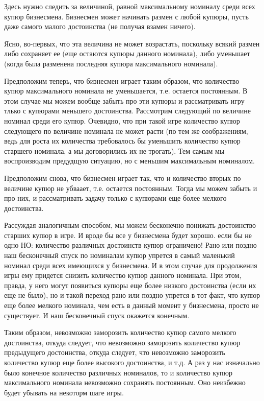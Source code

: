 \begin{enumerate}
Здесь нужно следить за величиной, равной максимальному номиналу среди всех купюр бизнесмена. Бизнесмен может начинать размен с любой купюры, пусть даже самого малого достоинства (не получая взамен ничего).

Ясно, во-первых, что эта величина не может возрастать, поскольку всякий размен либо сохраняет ее (еще остаются купюры данного номинала), либо уменьшает (когда была разменена последняя купюра максимального номинала).

Предположим теперь, что бизнесмен играет таким образом, что количество купюр максимального номинала не уменьшается, т.е. остается постоянным. В этом случае мы можем вообще забыть про эти купюры и рассматривать игру тлько с купюрами меньшего достоинства. Рассмотрим следующий по величине номинал среди его купюр. Очевидно, что при такой игре количество купюр следующего по величине номинала не может расти (по тем же соображениям, ведь для роста их количества требовалось бы уменьшить количество купюр старшего номинала, а мы договорились их не трогать). Тем самым мы воспроизводим предудщую ситуацию, но с меньшим максимальным номиналом.

Предположим снова, что бизнесмен играет так, что и количество вторых по величине купюр не убваает, т.е. остается постоянным. Тогда мы можем забыть и про них, и рассматривать задачу только с купюрами еще более мелкого достоинства.

Рассуждая аналогичным способом, мы можем бесконечно понижать достоинство старших купюр в игре. И вроде бы все у бизнесмена будет хорошо. если бы не одно НО: количество различных достоинств купюр ограничено! Рано или поздно наш бесконечный спуск по номиналам купюр упрется в самый маленький номинал среди всех имеющихся у бизнесмена. И в этом случае для продолжения игры ему придется снизить количество купюр данного номинала. При этом, правда, у него могут появиться купюры еще более низкого достоинства (если их еще не было), но и такой переход рано или поздно упрется в тот факт, что купюр еще более мелкого номинала, чем есть в данный момент у бизнесмена, просто не существует. И наш бесконечный спуск окажется конечным.

Таким образом, невозможно заморозить количество купюр самого мелкого достоинства, откуда следует, что невозможно заморозить количество купюр предыдущего достоинства, откуда следует, что невозможно заморозить количество купюр еще более высокого достоинства, и т.д. А раз у нас изначально было конечное количество различных номиналов, то и количество купюр максимального номинала невозможно сохранять постоянным. Оно неизбежно будет убывать на некоторм шаге игры.


\end{enumerate}

